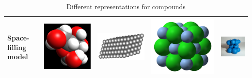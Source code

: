 \begin{table}[H]
\begin{center}
\begin{tabular}{|p{2cm}|l|l|l|l|}
\textbf{Space-filling model} & \includegraphics[width=.1\textwidth]{photos/glucose_spacefill.png}  & \includegraphics[width=.2\textwidth]{photos/graphite_spacefill.png} & \includegraphics[width=.1\textwidth]{photos/silverchloride_spacefill_wikipedia.png} & \includegraphics[width=.1\textwidth]{photos/zinc_spacefill.png} \\ \hline
  \end{tabular}
 \end{center}
\caption{Different representations for compounds}
\label{tab:atommodels}
\end{table}
\pagebreak
